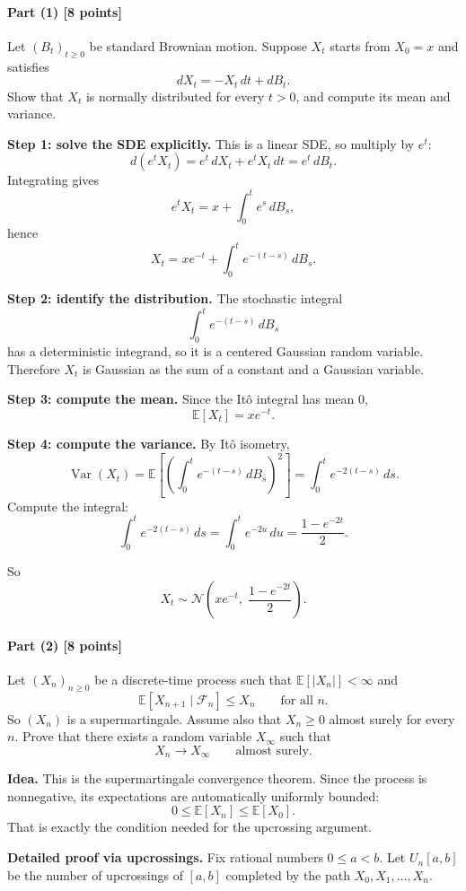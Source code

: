 \documentclass[11pt]{article}
\theoremstyle{definition}
\begin{document}
\paragraph{Part (1) \hfill [8 points]}
Let \((B_t)_{t\ge 0}\) be standard Brownian motion. Suppose \(X_t\) starts from \(X_0=x\) and satisfies
\[
dX_t=-X_t\,dt+dB_t.
\]
Show that \(X_t\) is normally distributed for every \(t>0\), and compute its mean and variance.

\textbf{Step 1: solve the SDE explicitly.}
This is a linear SDE, so multiply by \(e^t\):
\[
d(e^t X_t)=e^t\,dX_t+e^t X_t\,dt=e^t\,dB_t.
\]
Integrating gives
\[
e^t X_t=x+\int_0^t e^s\,dB_s,
\]
hence
\[
\boxed{
X_t=x e^{-t}+\int_0^t e^{-(t-s)}\,dB_s.
}
\]

\textbf{Step 2: identify the distribution.}
The stochastic integral
\[
\int_0^t e^{-(t-s)}\,dB_s
\]
has a deterministic integrand, so it is a centered Gaussian random variable. Therefore \(X_t\) is Gaussian as the sum of a constant and a Gaussian variable.

\textbf{Step 3: compute the mean.}
Since the It\^o integral has mean \(0\),
\[
\mathbb E[X_t]
=
x e^{-t}.
\]

\textbf{Step 4: compute the variance.}
By It\^o isometry,
\[
\operatorname{Var}(X_t)
=
\mathbb E\!\left[\left(\int_0^t e^{-(t-s)}\,dB_s\right)^2\right]
=
\int_0^t e^{-2(t-s)}\,ds.
\]
Compute the integral:
\[
\int_0^t e^{-2(t-s)}\,ds
=
\int_0^t e^{-2u}\,du
=
\frac{1-e^{-2t}}{2}.
\]

So
\[
\boxed{
X_t\sim \mathcal N\!\left(x e^{-t},\;\frac{1-e^{-2t}}{2}\right).
}
\]

\paragraph{Part (2) \hfill [8 points]}
Let \((X_n)_{n\ge 0}\) be a discrete-time process such that \(\mathbb E[|X_n|]<\infty\) and
\[
\mathbb E[X_{n+1}\mid \mathcal F_n]\le X_n
\qquad \text{for all } n.
\]
So \((X_n)\) is a supermartingale. Assume also that \(X_n\ge 0\) almost surely for every \(n\). Prove that there exists a random variable \(X_\infty\) such that
\[
X_n\to X_\infty
\qquad \text{almost surely.}
\]

\textbf{Idea.}
This is the supermartingale convergence theorem. Since the process is nonnegative, its expectations are automatically uniformly bounded:
\[
0\le \mathbb E[X_n]\le \mathbb E[X_0].
\]
That is exactly the condition needed for the upcrossing argument.

\textbf{Detailed proof via upcrossings.}
Fix rational numbers \(0\le a<b\). Let \(U_n[a,b]\) be the number of upcrossings of \([a,b]\) completed by the path \(X_0,X_1,\dots,X_n\).
\end{document}
